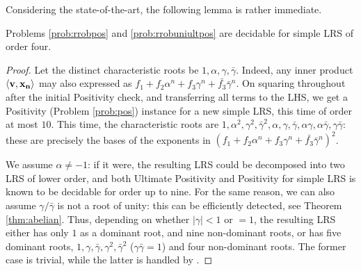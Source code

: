 Considering the state-of-the-art, the following lemma is rather immediate. 
\begin{lemma}
Problems \ref{prob:rrobpos} and \ref{prob:rrobuniultpos} are decidable for simple LRS of order four.
\end{lemma}
\begin{proof}
Let the distinct characteristic roots be $1, \alpha, \gamma, \bar{\gamma}$. Indeed, any inner product $\langle\mathbf{v}, \mathbf{x_n}\rangle$ may also expressed as $f_1 + f_2\alpha^n + f_3 \gamma^n + \bar{f_3}\bar{\gamma}^n$. On squaring throughout after the initial Positivity check, and transferring all terms to the LHS, we get a Positivity (Problem \ref{prob:pos}) instance for a new simple LRS, this time of order at most $10$. This time, the characteristic roots are $1, \alpha^2, \gamma^2, \bar{\gamma}^2, \alpha, \gamma, \bar{\gamma}, \alpha\gamma, \alpha\bar{\gamma}, \gamma\bar{\gamma}$: these are precisely the bases of the exponents in $(f_1 + f_2\alpha^n + f_3 \gamma^n + \bar{f_3}\bar{\gamma}^n)^2$.

We assume $\alpha \ne -1$: if it were, the resulting LRS could be decomposed into two LRS of lower order, and both Ultimate Positivity \cite{ouaknine2014ultimate} and Positivity  \cite{ouaknine2014positivity} for simple LRS is known to be decidable for order up to nine. For the same reason, we can also assume $\gamma/\bar{\gamma}$ is not a root of unity: this can be efficiently detected, see Theorem \ref{thm:abelian}. Thus, depending on whether $|\gamma| < 1$ or $= 1$, the resulting LRS either has only $1$ as a dominant root, and nine non-dominant roots, or has five dominant roots, $1, \gamma, \bar{\gamma}, \gamma^2, \bar{\gamma}^2$ ($\gamma\bar{\gamma} = 1$) and four non-dominant roots. The former case is trivial, while the latter is handled by \cite{ouaknine2014positivity}.
\end{proof}

